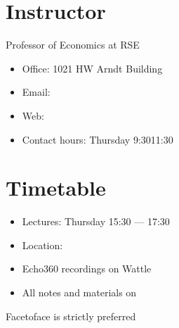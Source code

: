 \documentclass[letterpaper,10pt,english]{jupyterBook}
\begin{document}
\chapter{Instructor}
\label{\detokenize{01.introduction:instructor}}
\sphinxAtStartPar
{}
Professor of Economics at RSE
\begin{itemize}
\item {} 
\sphinxAtStartPar
Office: 1021 HW Arndt Building

\item {} 
\sphinxAtStartPar
Email: 

\item {} 
\sphinxAtStartPar
Web: 

\item {} 
\sphinxAtStartPar
Contact hours: Thursday 9:30\sphinxhyphen{}11:30

\end{itemize}


\chapter{Timetable}
\label{\detokenize{01.introduction:timetable}}
\sphinxAtStartPar
{}
\begin{itemize}
\item {} 
\sphinxAtStartPar
Lectures: Thursday 15:30 — 17:30

\item {} 
\sphinxAtStartPar
Location: 

\end{itemize}

\sphinxAtStartPar
{}
\begin{itemize}
\item {} 
\sphinxAtStartPar
Echo\sphinxhyphen{}360 recordings on Wattle

\item {} 
\sphinxAtStartPar
All notes and materials on 

\end{itemize}

\sphinxAtStartPar
Face\sphinxhyphen{}to\sphinxhyphen{}face is strictly preferred
\end{document}
